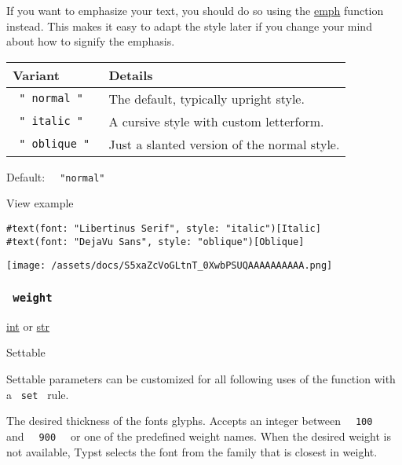 If you want to emphasize your text, you should do so using the
\href{/docs/reference/model/emph/}{emph} function instead. This makes it
easy to adapt the style later if you change your mind about how to
signify the emphasis.

\begin{longtable}[]{@{}ll@{}}
\toprule\noalign{}
Variant & Details \\
\midrule\noalign{}
\endhead
\bottomrule\noalign{}
\endlastfoot
\texttt{\ "\ normal\ "\ } & The default, typically upright style. \\
\texttt{\ "\ italic\ "\ } & A cursive style with custom letterform. \\
\texttt{\ "\ oblique\ "\ } & Just a slanted version of the normal
style. \\
\end{longtable}

Default: \texttt{\ }{\texttt{\ "normal"\ }}\texttt{\ }


View example

\begin{verbatim}
#text(font: "Libertinus Serif", style: "italic")[Italic]
#text(font: "DejaVu Sans", style: "oblique")[Oblique]
\end{verbatim}

\texttt{[image: /assets/docs/S5xaZcVoGLtnT\_0XwbPSUQAAAAAAAAAA.png]}

\subsubsection{\texorpdfstring{\texttt{\ weight\ }}{ weight }}\label{parameters-weight}

\href{/docs/reference/foundations/int/}{int} {or}
\href{/docs/reference/foundations/str/}{str}

{{ Settable }}

\label{parameters-weight-settable-tooltip}
Settable parameters can be customized for all following uses of the
function with a \texttt{\ set\ } rule.

The desired thickness of the font\textquotesingle s glyphs. Accepts an
integer between \texttt{\ }{\texttt{\ 100\ }}\texttt{\ } and
\texttt{\ }{\texttt{\ 900\ }}\texttt{\ } or one of the predefined weight
names. When the desired weight is not available, Typst selects the font
from the family that is closest in weight.

